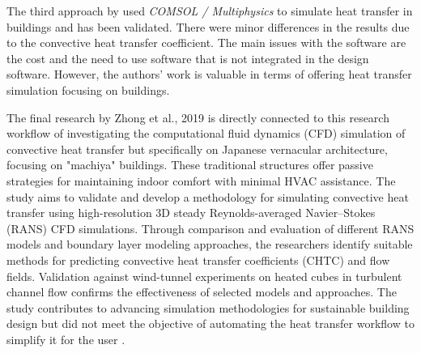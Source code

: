 The third approach by \cite{COMSOL} used \textit{COMSOL / Multiphysics} to simulate heat transfer in buildings and has been validated. There were minor differences in the results due to the convective heat transfer coefficient. 
The main issues with the software are the cost and the need to use software that is not integrated in the design software.
However, the authors' work is valuable in terms of offering heat transfer simulation focusing on buildings.  %

The final research by Zhong et al., 2019 \cite{litrev2} is directly connected to this research workflow of investigating the computational fluid dynamics (CFD) simulation of convective heat transfer but specifically on Japanese vernacular architecture, focusing on "machiya" buildings. These traditional structures offer passive strategies for maintaining indoor comfort with minimal HVAC assistance. The study aims to validate and develop a methodology for simulating convective heat transfer using high-resolution 3D steady Reynolds-averaged Navier–Stokes (RANS) CFD simulations. Through comparison and evaluation of different RANS models and boundary layer modeling approaches, the researchers identify suitable methods for predicting convective heat transfer coefficients (CHTC) and flow fields. Validation against wind-tunnel experiments on heated cubes in turbulent channel flow confirms the effectiveness of selected models and approaches. The study contributes to advancing simulation methodologies for sustainable building design but did not meet the objective of automating the heat transfer workflow to simplify it for the user \cite{litrev2}. 





